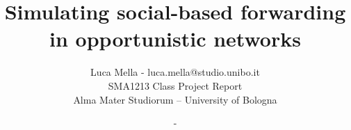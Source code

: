 \documentclass[a4paper]{article}
\begin{document}
\title{Simulating social-based forwarding in opportunistic networks}
\author{Luca Mella - luca.mella@studio.unibo.it \\ SMA1213 Class Project Report \\ Alma Mater Studiorum -- University of Bologna \\ }
\date{-}

\maketitle


\sloppy



\newpage


\newpage


\newpage


\newpage


\newpage


\newpage
\nocite{*}
{}
 
\end{document}
